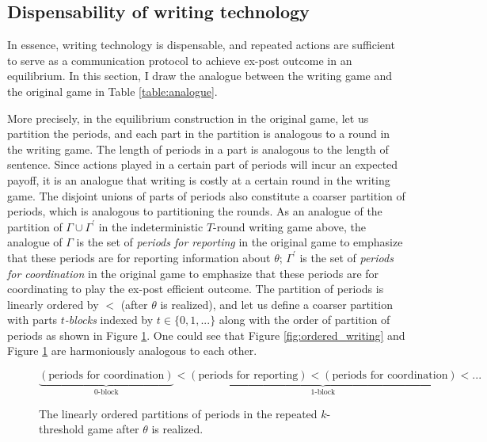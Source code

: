 \documentclass[12pt,letter]{article}
\theoremstyle{definition}
\theoremstyle{remark}
\theoremstyle{claim}
\begin{document}
\subsection{Dispensability of writing technology}
\label{sec:dis_writing}
In essence, writing technology is dispensable, and repeated actions are sufficient to serve as a communication protocol to achieve ex-post outcome in an  equilibrium. In this section, I draw the analogue between the writing game and the original game in Table \ref{table:analogue}. 

More precisely, in the equilibrium construction in the original game, let us partition the periods, and each part in the partition is analogous to a round in the writing game. The length of periods in a part is analogous to the length of sentence. Since actions played in a certain part of periods will incur an expected payoff, it is an analogue that writing is costly at a certain round in the writing game. The disjoint unions of parts of periods also constitute a coarser partition of periods, which is analogous to partitioning the rounds. As an analogue of the partition of $\Gamma\cup\Gamma^{'}$ in the indeterministic $T$-round writing game above, the analogue of $\Gamma$ is the set of \textit{periods for reporting} in the original game to emphasize that these periods are for reporting information about $\theta$; $\Gamma^{'}$ is the set of \textit{periods for coordination} in the original game to emphasize that these periods are for coordinating to play the ex-post efficient outcome. The partition of periods is linearly ordered by $<$ (after $\theta$ is realized), and let us define a coarser partition with parts \textit{$t$-blocks} indexed by $t\in\{0,1,...\}$ along with the order of partition of periods as shown in Figure \ref{fig:ordered_original_game}. One could see that Figure \ref{fig:ordered_writing} and Figure \ref{fig:ordered_original_game} are harmoniously analogous to each other.

\begin{figure}
\caption{The linearly ordered partitions of periods in the repeated $k$-threshold game after $\theta$ is realized.}
\label{fig:ordered_original_game}
\[\underbrace{(\text{periods for coordination})}_{\text{$0$-block}}<\underbrace{(\text{periods for reporting})<(\text{periods for coordination})}_{\text{$1$-block}}<...\]

\end{figure}
\end{document}
